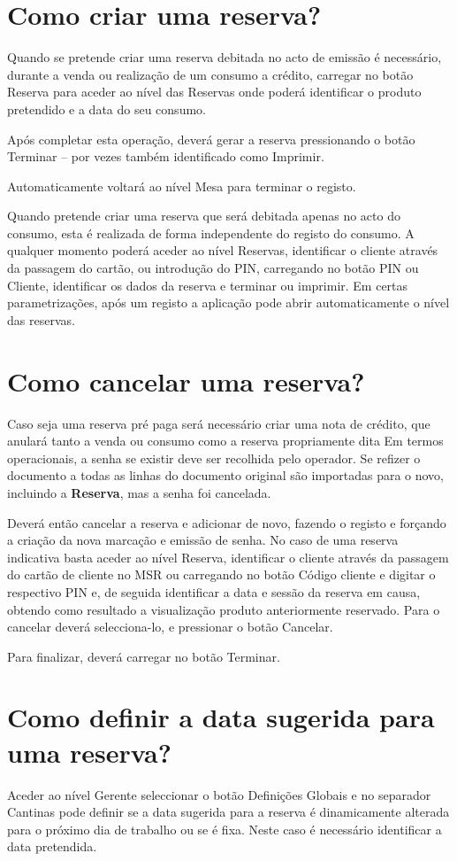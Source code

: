 \documentclass[a4paper,11pt,openany]{memoir}
\begin{document}
\section{Como criar uma reserva?}
Quando se pretende criar uma reserva debitada no acto de emissão é necessário,
durante a venda ou realização de um consumo a crédito, carregar no botão Reserva
para aceder ao nível das Reservas onde poderá identificar o produto pretendido e a
data do seu consumo. 

Após completar esta operação, deverá gerar a reserva
pressionando o botão Terminar – por vezes também identificado como Imprimir.

Automaticamente voltará ao nível Mesa para terminar o registo.

Quando pretende criar uma reserva que será debitada apenas no acto do consumo,
esta é realizada de forma independente do registo do consumo. A qualquer
momento poderá aceder ao nível Reservas, identificar o cliente através da
passagem do cartão, ou introdução do PIN, carregando no botão PIN ou Cliente,
identificar os dados da reserva e terminar ou imprimir.
Em certas parametrizações, após um registo a aplicação pode abrir
automaticamente o nível das reservas.

\section{Como cancelar uma reserva?}
Caso seja uma reserva pré paga será necessário criar uma nota de crédito, que
anulará tanto a venda ou consumo como a reserva propriamente dita Em termos
operacionais, a senha se existir deve ser recolhida pelo operador. Se refizer o
documento a todas as linhas do documento original são importadas para o novo,
incluindo a \textbf{Reserva}, mas a senha foi cancelada.

Deverá então cancelar a reserva
e adicionar de novo, fazendo o registo e forçando a criação da nova marcação e
emissão de senha. No caso de uma reserva indicativa basta aceder ao nível
Reserva, identificar o cliente através da passagem do cartão de cliente no MSR ou
carregando no botão Código cliente e digitar o respectivo PIN e, de seguida
identificar a data e sessão da reserva em causa, obtendo como resultado a
visualização produto anteriormente reservado. Para o cancelar deverá selecciona-lo,
e pressionar o botão Cancelar. 

Para finalizar, deverá carregar no botão Terminar.

\section{Como definir a data sugerida para uma reserva?}
Aceder ao nível Gerente seleccionar o botão Definições Globais e no separador
Cantinas pode definir se a data sugerida para a reserva é dinamicamente alterada
para o próximo dia de trabalho ou se é fixa. Neste caso é necessário identificar a
data pretendida.
\end{document}
